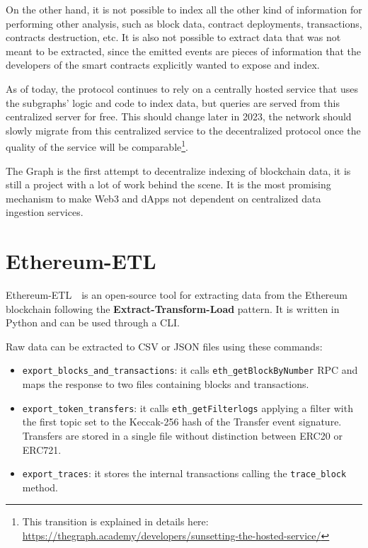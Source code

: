 On the other hand, it is not possible to index all the other kind of information for performing other analysis, such as block data, contract deployments, transactions, contracts destruction, etc. It is also not possible to extract data that was not meant to be extracted, since the emitted events are pieces of information that the developers of the smart contracts explicitly wanted to expose and index. 

As of today, the protocol continues to rely on a centrally hosted service that uses the subgraphs' logic and code to index data, but queries are served from this centralized server for free. This should change later in 2023, the network should slowly migrate from this centralized service to the decentralized protocol once the quality of the service will be comparable\footnote{This transition is explained in details here: \url{https://thegraph.academy/developers/sunsetting-the-hosted-service/}}.

The Graph is the first attempt to decentralize indexing of blockchain data, it is still a project with a lot of work behind the scene. It is the most promising mechanism to make Web3 and dApps not dependent on centralized data ingestion services.

\section{Ethereum-ETL}

Ethereum-ETL~\cite{ethereum-etl}~is an open-source tool for extracting data from the Ethereum blockchain following the \textbf{Extract-Transform-Load} pattern. It is written in Python and can be used through a CLI.

\noindent Raw data can be extracted to CSV or JSON files using these commands:

\begin{itemize}
    \item \verb|export_blocks_and_transactions|: it calls \verb|eth_getBlockByNumber| RPC and maps the response to two files containing blocks and transactions.
    \item \verb|export_token_transfers|: it calls \verb|eth_getFilterlogs| applying a filter with the first topic set to the Keccak-256 hash of the Transfer event signature. Transfers are stored in a single file without distinction between ERC20 or ERC721.   
    \item \verb|export_traces|: it stores the internal transactions calling the \verb|trace_block| method.
\end{itemize}

